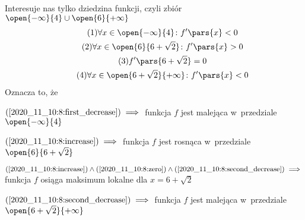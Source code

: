 Interesuje nas tylko dziedzina funkcji, czyli zbiór \(\open{-\infty}{4} \cup \open{6}{+\infty}\)
\begin{gather*}
    \tag{\(1\)} \forall x \in \open{-\infty}{4}\colon f'\pars{x} < 0 \label{2020_11_10:8:first_decrease}\\
    \tag{\(2\)} \forall x \in \open{6}{6 + \sqrt{2}}\colon f'\pars{x} > 0 \label{2020_11_10:8:increase}\\
    \tag{\(3\)} f'\pars{6 + \sqrt{2}} = 0 \label{2020_11_10:8:zero}\\
    \tag{\(4\)} \forall x \in \open{6 + \sqrt{2}}{+\infty}\colon f'\pars{x} < 0 \label{2020_11_10:8:second_decrease}
\end{gather*}
Oznacza to, że
\begin{description}
    \item \(\mbox{(\ref{2020_11_10:8:first_decrease})} \implies\) funkcja \(f\) jest malejąca w~przedziale \(\open{-\infty}{4}\)
    \item \(\mbox{(\ref{2020_11_10:8:increase})} \implies\) funkcja \(f\) jest rosnąca w~przedziale \(\open{6}{6 + \sqrt{2}}\)
    \item \(\mbox{(\ref{2020_11_10:8:increase})} \land \mbox{(\ref{2020_11_10:8:zero})} \land \mbox{(\ref{2020_11_10:8:second_decrease})} \implies\) funkcja \(f\) osiąga maksimum lokalne dla \(x = 6 + \sqrt{2}\)
    \item \(\mbox{(\ref{2020_11_10:8:second_decrease})} \implies\) funkcja \(f\) jest malejąca w~przedziale \(\open{6 + \sqrt{2}}{+\infty}\)
\end{description}
